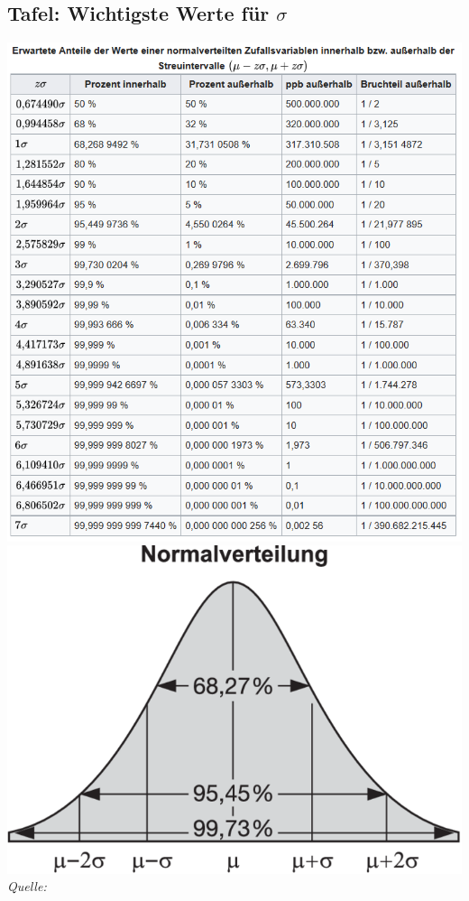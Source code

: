\subsection{Tafel: Wichtigste Werte für $\sigma$}
\label{Anh:WichtigeSigma}
\begin{minipage}{\linewidth}
\begin{center}
		\includegraphics[width=0.8\linewidth]{figures/WichtigsteWerteSigma.png}\\
		\includegraphics[width=0.3\linewidth]{figures/Normalverteilung.png}\\
		\textit{Quelle:}\cite{C:Normalverteilung}
\end{center}		

\end{minipage}
